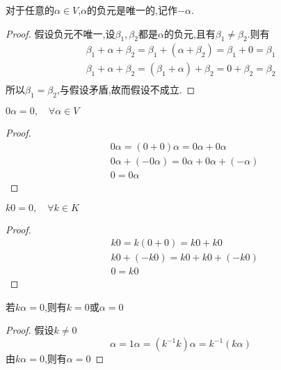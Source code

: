 \documentclass[blue,normal,cn]{elegantnote}
\begin{document}
\begin{property}
    对于任意的$α ∈ V$,$α$的负元是唯一的,记作$-α$.
\end{property}

\begin{proof}
    假设负元不唯一,设$β_1,β_2$都是$α$的负元,且有$β_1 ≠ β_2 $.则有
    \begin{equation*}
        \begin{aligned}
            β_1+α+β_2=β_1+(α+β_2)=β_1+0=β_1\\
            β_1+α+β_2= (β_1+α)+β_2=0+β_2=β_2\\
        \end{aligned}
    \end{equation*}
    所以$β_1=β_2$,与假设矛盾,故而假设不成立.
\end{proof}


\begin{property}
    $0α=0,\quad \forall α ∈ V$
\end{property}

\begin{proof}
    \begin{equation*}
        \begin{aligned}
        &0α=(0+0)α=0α+0α\\
        &0α+(-0α)=0α+0α+(-α)\\
        &0=0α
        \end{aligned}
    \end{equation*}
\end{proof}


\begin{property}
    $k0=0,\quad \forall k ∈ K$
\end{property}

\begin{proof}
    \begin{equation*}
        \begin{aligned}
        &k0=k(0+0)=k0+k0\\
        &k0+(-k0)=k0+k0+(-k0)\\
        &0=k0
        \end{aligned}
    \end{equation*}
\end{proof}

\begin{property}
   若$kα=0$,则有$k=0$或$α=0$
\end{property}

\begin{proof}
    假设$k≠ 0$
    \begin{equation*}
        α=1α=(k^{-1}k)α=k^{-1}(kα)
    \end{equation*}
    由$kα=0$,则有$α=0$
\end{proof}
\end{document}
